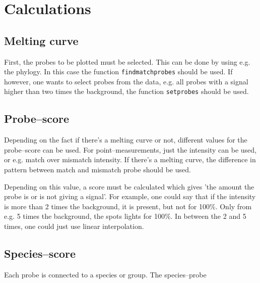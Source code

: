 \documentclass[english,widemargin]{article}
\begin{document}
\newpage

\section{Calculations}


\subsection{Melting curve}

First, the probes to be plotted must be selected. This can be done by using e.g. the phylogy. In this case the function \texttt{findmatchprobes} should be used. If however, one wants to select probes from the data, e.g. all probes with a signal higher than two times the background, the function \texttt{setprobes} should be used.




\subsection{Probe--score}

Depending on the fact if there's a melting curve or not, different values for the probe--score can be used. For point--measurements, just the intensity can be used, or e.g. match over mismatch intensity. If there's a melting curve, the difference in pattern between match and mismatch probe should be used.

Depending on this value, a score must be calculated which gives 'the amount the probe is or is not giving a signal'. For example, one could say that if the intensity is more than 2 times the background, it is present, but not for 100\%. Only from e.g. 5 times the background, the spots lights for 100\%. In between the 2 and 5 times, one could just use linear interpolation.



\subsection{Species--score}

Each probe is connected to a species or group. The species--probe 




\newpage
\end{document}
